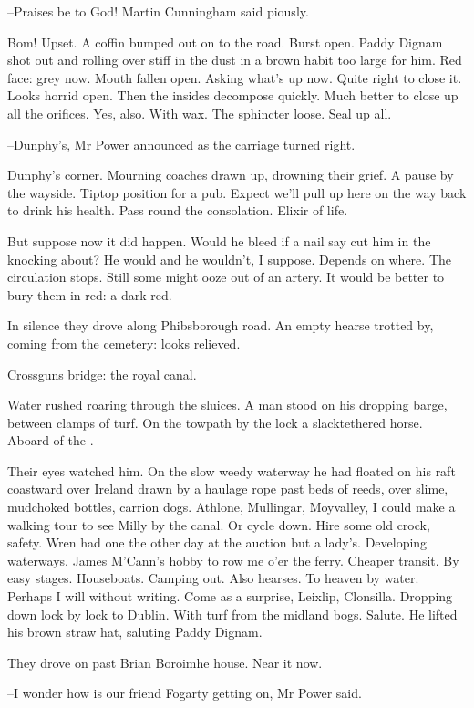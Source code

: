 --Praises be to God!
Martin Cunningham said piously.

Bom!
Upset.
A coffin bumped out on to the road.
Burst open.
Paddy Dignam shot out and rolling over stiff in the dust
in a brown habit too large for him.
Red face:
grey now.
Mouth fallen open.
Asking what's up now.
Quite right to close it.
Looks horrid open.
Then the insides decompose quickly.
Much better to close up all the orifices.
Yes, also.
With wax.
The sphincter loose.
Seal up all.

--Dunphy's,
Mr Power announced
as the carriage turned right.

Dunphy's corner.
Mourning coaches drawn up, drowning their grief.
A pause by the wayside.
Tiptop position for a pub.
Expect we'll pull up here on the way back to drink his health.
Pass round the consolation.
Elixir of life.

But suppose now it did happen.
Would he bleed if a nail say cut him in the knocking about?
He would and he wouldn't, I suppose.
Depends on where.
The circulation stops.
Still some might ooze out of an artery.
It would be better to bury them in red:
a dark red.

In silence they drove along Phibsborough road.
An empty hearse trotted by, coming from the cemetery:
looks relieved.

Crossguns bridge:
the royal canal.

Water rushed roaring through the sluices.
A man stood on his
dropping barge, between clamps of turf.
On the towpath by the lock
a slacktethered horse.
Aboard of the .

Their eyes watched him.
On the slow weedy waterway
he had floated on his raft coastward over Ireland
drawn by a haulage rope
past beds of reeds,
over slime, mudchoked bottles, carrion dogs.
Athlone, Mullingar, Moyvalley,
I could make a walking tour to see Milly by the canal.
Or cycle down.
Hire some old crock, safety.
Wren had one the other day at the auction but a lady's.
Developing waterways.
James M'Cann's hobby to row me o'er the ferry.
Cheaper transit.
By easy stages.
Houseboats.
Camping out.
Also hearses.
To heaven by water.
Perhaps I will without writing.
Come as a surprise, Leixlip, Clonsilla.
Dropping down lock by lock to Dublin.
With turf from the midland bogs.
Salute.
He lifted his brown straw hat,
saluting Paddy Dignam.

They drove on past Brian Boroimhe house.
Near it now.

--I wonder how is our friend Fogarty getting on,
Mr Power said.

